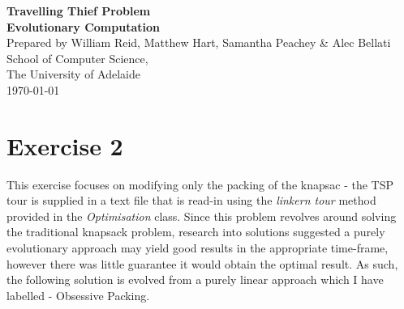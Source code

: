 \documentclass[a4paper,12pt]{article}
\begin{document}
\begin{center}
{\LARGE\bf Travelling Thief Problem}\\
\vspace{0.5cm}
{\Large\bf Evolutionary Computation}\\
\vspace{1cm}
Prepared by William Reid, Matthew Hart, Samantha Peachey \& Alec Bellati\\
\vspace{1cm}
School of Computer Science,\\
The University of Adelaide\\
\vspace{1cm}
\today
\end{center}

\vspace{1cm}
\section*{Exercise 2}
This exercise focuses on modifying only the packing of the knapsac - the TSP tour is supplied in a text file that is read-in using the \textit{linkern tour} method provided in the \textit{Optimisation} class. Since this problem revolves around solving the traditional knapsack problem, research into solutions suggested a purely evolutionary approach may yield good results in the appropriate time-frame, however there was little guarantee it would obtain the optimal result. As such, the following solution is evolved from a purely linear approach which I have labelled - Obsessive Packing. 
\end{document}

